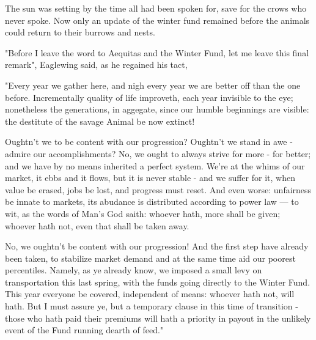 


The sun was setting by the time all had been spoken for, save for the crows who never spoke. Now only an update of the winter fund remained before the animals could return to their burrows and nests.

"Before I leave the word to Aequitas and the Winter Fund, let me leave this final remark", Eaglewing said, as he regained his tact,

"Every year we gather here, and nigh every year we are better off than the one before. Incrementally quality of life improveth, each year invisible to the eye; nonetheless the generations, in aggegate, since our humble beginnings are visible: the destitute of the savage Animal be now extinct!

Oughtn't we to be content with our progression? Oughtn't we stand in awe - admire our accomplishments? No, we ought to always strive for more - for better; and we have by no means inherited a perfect system. We're at the whims of our market, it ebbs and it flows, but it is never stable - and we suffer for it, when value be erased, jobs be lost, and progress must reset. And even worse: unfairness be innate to markets, its abudance is distributed according to power law — to wit, as the words of Man's God saith: whoever hath, more shall be given; whoever hath not, even that shall be taken away.

No, we oughtn't be content with our progression! And the first step have already been taken, to stabilize market demand and at the same time aid our poorest percentiles. Namely, as ye already know, we imposed a small levy on transportation this last spring, with the funds going directly to the Winter Fund. This year everyone be covered, independent of means: whoever hath not, will hath. But I must assure ye, but a temporary clause in this time of transition - those who hath paid their premiums will hath a priority in payout in the unlikely event of the Fund running dearth of feed."

